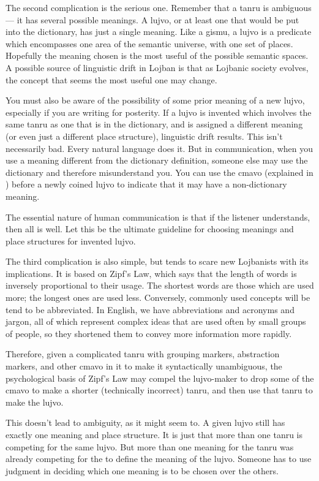 The second complication is the serious one. Remember that a tanru is ambiguous --- it has several possible meanings. A lujvo, or at least one that would be put into the dictionary, has just a single meaning. Like a gismu, a lujvo is a predicate which encompasses one area of the semantic universe, with one set of places. Hopefully the meaning chosen is the most useful of the possible semantic spaces. A possible source of linguistic drift in Lojban is that as Lojbanic society evolves, the concept that seems the most useful one may change.

You must also be aware of the possibility of some prior meaning of a new lujvo, especially if you are writing for posterity. If a lujvo is invented which involves the same tanru as one that is in the dictionary, and is assigned a different meaning (or even just a different place structure), linguistic drift results. This isn't necessarily bad. Every natural language does it. But in communication, when you use a meaning different from the dictionary definition, someone else may use the dictionary and therefore misunderstand you. You can use the cmavo  (explained in ) before a newly coined lujvo to indicate that it may have a non-dictionary meaning.

The essential nature of human communication is that if the listener understands, then all is well. Let this be the ultimate guideline for choosing meanings and place structures for invented lujvo.

The third complication is also simple, but tends to scare new Lojbanists with its implications. It is based on Zipf's Law, which says that the length of words is inversely proportional to their usage. The shortest words are those which are used more; the longest ones are used less. Conversely, commonly used concepts will be tend to be abbreviated. In English, we have abbreviations and acronyms and jargon, all of which represent complex ideas that are used often by small groups of people, so they shortened them to convey more information more rapidly.

Therefore, given a complicated tanru with grouping markers, abstraction markers, and other cmavo in it to make it syntactically unambiguous, the psychological basis of Zipf's Law may compel the lujvo-maker to drop some of the cmavo to make a shorter (technically incorrect) tanru, and then use that tanru to make the lujvo.

This doesn't lead to ambiguity, as it might seem to. A given lujvo still has exactly one meaning and place structure. It is just that more than one tanru is competing for the same lujvo. But more than one meaning for the tanru was already competing for the  to define the meaning of the lujvo. Someone has to use judgment in deciding which one meaning is to be chosen over the others.

